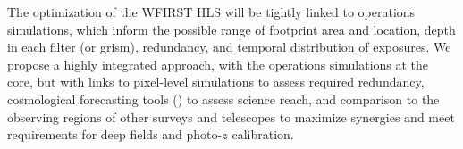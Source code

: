 %
% 

The optimization of the WFIRST HLS will be tightly linked to operations simulations,
which inform the possible
range of footprint area and location, depth in each filter (or grism), redundancy,
and temporal distribution of exposures. We propose a highly integrated approach, with the
operations simulations at the core, but with links to pixel-level simulations to assess required
redundancy, cosmological forecasting tools (\CoLi) to assess science reach, and comparison to the
observing regions of other surveys and telescopes to maximize synergies and meet requirements for
deep fields and photo-$z$ calibration.


%



